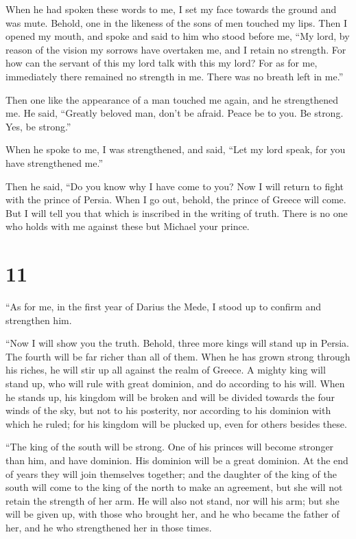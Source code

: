  When he had spoken these words to me, I set my face
towards the ground and was mute.  Behold, one in the
likeness of the sons of men touched my lips. Then I opened my mouth, and
spoke and said to him who stood before me, ``My lord, by reason of the
vision my sorrows have overtaken me, and I retain no strength.
 For how can the servant of this my lord talk with this my
lord? For as for me, immediately there remained no strength in me. There
was no breath left in me.''

 Then one like the appearance of a man touched me again,
and he strengthened me.  He said, ``Greatly beloved man,
don't be afraid. Peace be to you. Be strong. Yes, be strong.''

When he spoke to me, I was strengthened, and said, ``Let my lord speak,
for you have strengthened me.''

 Then he said, ``Do you know why I have come to you? Now I
will return to fight with the prince of Persia. When I go out, behold,
the prince of Greece will come.  But I will tell you that
which is inscribed in the writing of truth. There is no one who holds
with me against these but Michael your prince.

\hypertarget{section-10}{%
\section{11}\label{section-10}}

 ``As for me, in the first year of Darius the Mede, I stood
up to confirm and strengthen him.

 ``Now I will show you the truth. Behold, three more kings
will stand up in Persia. The fourth will be far richer than all of them.
When he has grown strong through his riches, he will stir up all against
the realm of Greece.  A mighty king will stand up, who will
rule with great dominion, and do according to his will. 
When he stands up, his kingdom will be broken and will be divided
towards the four winds of the sky, but not to his posterity, nor
according to his dominion with which he ruled; for his kingdom will be
plucked up, even for others besides these.

 ``The king of the south will be strong. One of his princes
will become stronger than him, and have dominion. His dominion will be a
great dominion.  At the end of years they will join
themselves together; and the daughter of the king of the south will come
to the king of the north to make an agreement, but she will not retain
the strength of her arm. He will also not stand, nor will his arm; but
she will be given up, with those who brought her, and he who became the
father of her, and he who strengthened her in those times.

